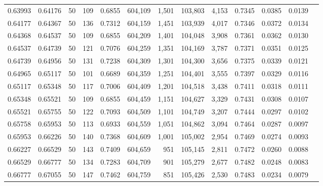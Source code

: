 \begin{tabular}{rrrrrrrrrrrrr}
0.63993 & 0.64176 &    50 & 109 &                                     0.6855 & 604,109 &   1,501 & 103,803 &   4,153 & 0.7345 & 0.0385 & 0.0139 \\
0.64177 & 0.64367 &    50 & 136 &                                     0.7312 & 604,159 &   1,451 & 103,939 &   4,017 & 0.7346 & 0.0372 & 0.0134 \\
0.64368 & 0.64537 &    50 & 109 &                                     0.6855 & 604,209 &   1,401 & 104,048 &   3,908 & 0.7361 & 0.0362 & 0.0130 \\
0.64537 & 0.64739 &    50 & 121 &                                     0.7076 & 604,259 &   1,351 & 104,169 &   3,787 & 0.7371 & 0.0351 & 0.0125 \\
0.64739 & 0.64956 &    50 & 131 &                                     0.7238 & 604,309 &   1,301 & 104,300 &   3,656 & 0.7375 & 0.0339 & 0.0121 \\
0.64965 & 0.65117 &    50 & 101 &                                     0.6689 & 604,359 &   1,251 & 104,401 &   3,555 & 0.7397 & 0.0329 & 0.0116 \\
0.65117 & 0.65348 &    50 & 117 &                                     0.7006 & 604,409 &   1,201 & 104,518 &   3,438 & 0.7411 & 0.0318 & 0.0111 \\
0.65348 & 0.65521 &    50 & 109 &                                     0.6855 & 604,459 &   1,151 & 104,627 &   3,329 & 0.7431 & 0.0308 & 0.0107 \\
0.65521 & 0.65755 &    50 & 122 &                                     0.7093 & 604,509 &   1,101 & 104,749 &   3,207 & 0.7444 & 0.0297 & 0.0102 \\
0.65758 & 0.65953 &    50 & 113 &                                     0.6933 & 604,559 &   1,051 & 104,862 &   3,094 & 0.7464 & 0.0287 & 0.0097 \\
0.65953 & 0.66226 &    50 & 140 &                                     0.7368 & 604,609 &   1,001 & 105,002 &   2,954 & 0.7469 & 0.0274 & 0.0093 \\
0.66227 & 0.66529 &    50 & 143 &                                     0.7409 & 604,659 &     951 & 105,145 &   2,811 & 0.7472 & 0.0260 & 0.0088 \\
0.66529 & 0.66777 &    50 & 134 &                                     0.7283 & 604,709 &     901 & 105,279 &   2,677 & 0.7482 & 0.0248 & 0.0083 \\
0.66777 & 0.67055 &    50 & 147 &                                     0.7462 & 604,759 &     851 & 105,426 &   2,530 & 0.7483 & 0.0234 & 0.0079 \\

\end{tabular}
